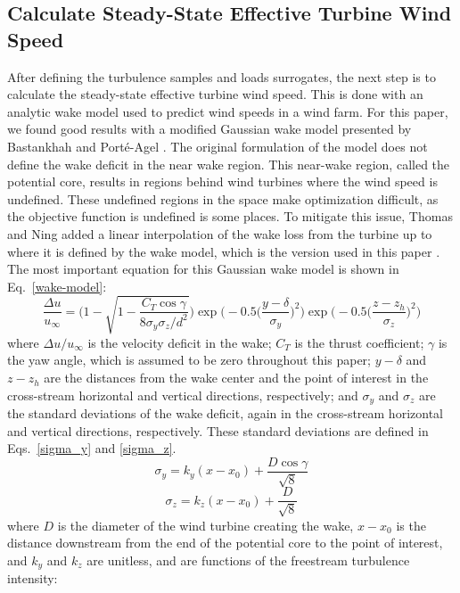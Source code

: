 \documentclass[11pt,letterpaper]{article}
\begin{document}
\subsection{Calculate Steady-State Effective Turbine Wind Speed}
\label{sec:windspeed}
After defining the turbulence samples and loads surrogates, the next step is to calculate the steady-state effective turbine wind speed. This is done with an analytic wake model used to predict wind speeds in a wind farm. For this paper, we found good results with a modified Gaussian wake model presented by Bastankhah and Porté-Agel \cite{bastankhah2016experimental}.
% 
The original formulation of the model does not define the wake deficit in the near wake region. This near-wake region, called the potential core, results in regions behind wind turbines where the wind speed is undefined. These undefined regions in the space make optimization difficult, as the objective function is undefined is some places. To mitigate this issue, Thomas and Ning added a linear interpolation of the wake loss from the turbine up to where it is defined by the wake model, which is the version used in this paper \cite{Thomas2018}. 
The most important equation for this Gaussian wake model is shown in Eq.~\ref{wake-model}:
% 
\begin{equation}
    \label{wake-model}
    \frac{\Delta u}{u_{\infty}} = \Bigg(1 - \sqrt{1 - \frac{C_T \cos{\gamma}}{8\sigma_y\sigma_z/d^2}}  \Bigg) \exp{\bigg(-0.5\Big(\frac{y-\delta}{\sigma_y} \Big)^2}\bigg) \exp{\bigg(-0.5\Big(\frac{z-z_h}{\sigma_z} \Big)^2}\bigg)
\end{equation}
%
\noindent where $\Delta u/u_{\infty}$ is the velocity deficit in the wake; $C_T$ is the thrust coefficient; $\gamma$ is the yaw angle, which is assumed to be zero throughout this paper; $y-\delta$ and $z-z_h$ are the distances from the wake center and the point of interest in the cross-stream horizontal and vertical directions, respectively; and $\sigma_y$ and $\sigma_z$ are the standard deviations of the wake deficit, again in the cross-stream horizontal and vertical directions, respectively. These standard deviations are defined in Eqs.~\ref{sigma_y} and \ref{sigma_z}.
%
\begin{equation}
    \label{sigma_y}
    \sigma_y = k_y(x-x_0) + \frac{D\cos{\gamma}}{\sqrt{8}}
\end{equation}
%
\begin{equation}
    \label{sigma_z}
    \sigma_z = k_z(x-x_0) + \frac{D}{\sqrt{8}}
\end{equation}
%
\noindent where $D$ is the diameter of the wind turbine creating the wake, $x-x_0$ is the distance downstream from the end of the potential core to the point of interest, and $k_y$ and $k_z$ are unitless, and are functions of the freestream turbulence intensity:
\end{document}

